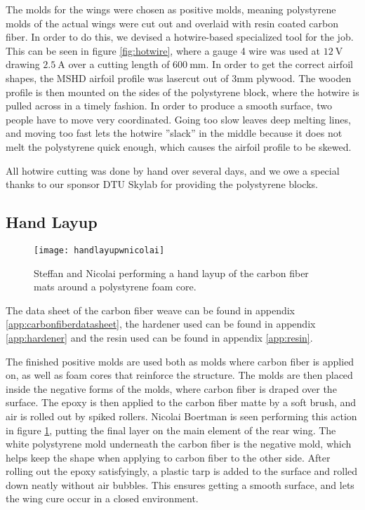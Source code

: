   The molds for the wings were chosen as positive molds, meaning polystyrene molds of the actual wings were cut out and overlaid with resin coated carbon fiber. In order to do this, we devised a hotwire-based specialized tool for the job. This can be seen in figure \ref{fig:hotwire}, where a gauge 4 wire was used at $\SI{12}{\volt}$ drawing $\SI{2.5}{\ampere}$ over a cutting length of $\SI{600}{\milli\metre}$. In order to get the correct airfoil shapes, the MSHD airfoil profile was lasercut out of 3mm plywood. The wooden profile is then mounted on the sides of the polystyrene block, where the hotwire is pulled across in a timely fashion. In order to produce a smooth surface, two people have to move very coordinated. Going too slow leaves deep melting lines, and moving too fast lets the hotwire ''slack'' in the middle because it does not melt the polystyrene quick enough, which causes the airfoil profile to be skewed.

  All hotwire cutting was done by hand over several days, and we owe a special thanks to our sponsor DTU Skylab for providing the polystyrene blocks.

  \subsection{Hand Layup}

    \begin{figure}
      \texttt{[image: handlayupwnicolai]}
      \caption{Steffan and Nicolai performing a hand layup of the carbon fiber mats around a polystyrene foam core.}
      \label{fig:handlayup}
    \end{figure}

    The data sheet of the carbon fiber weave can be found in appendix \ref{app:carbonfiberdatasheet}, the hardener used can be found in appendix \ref{app:hardener} and the resin used can be found in appendix \ref{app:resin}.

    The finished positive molds are used both as molds where carbon fiber is applied on, as well as foam cores that reinforce the structure. The molds are then placed inside the negative forms of the molds, where carbon fiber is draped over the surface. The epoxy is then applied to the carbon fiber matte by a soft brush, and air is rolled out by spiked rollers. Nicolai Boertman is seen performing this action in figure \ref{fig:handlayup}, putting the final layer on the main element of the rear wing. The white polystyrene mold underneath the carbon fiber is the negative mold, which helps keep the shape when applying to carbon fiber to the other side. After rolling out the epoxy satisfyingly, a plastic tarp is added to the surface and rolled down neatly without air bubbles. This ensures getting a smooth surface, and lets the wing cure occur in a closed environment.

